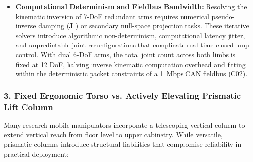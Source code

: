 \begin{itemize}[leftmargin=1.5em]
  \item \textbf{Computational Determinism and Fieldbus Bandwidth:} Resolving the kinematic inversion of 7-DoF redundant arms requires numerical pseudo-inverse damping ($\mathbf{J}^\dagger$) or secondary null-space projection tasks. These iterative solvers introduce algorithmic non-determinism, computational latency jitter, and unpredictable joint reconfigurations that complicate real-time closed-loop control. With dual 6-DoF arms, the total joint count across both limbs is fixed at 12 DoF, halving inverse kinematic computation overhead and fitting within the deterministic packet constraints of a 1~Mbps CAN fieldbus (C02).
\end{itemize}

\subsubsection{3. Fixed Ergonomic Torso vs. Actively Elevating Prismatic Lift Column}
Many research mobile manipulators incorporate a telescoping vertical column to extend vertical reach from floor level to upper cabinetry. While versatile, prismatic columns introduce structural liabilities that compromise reliability in practical deployment:

